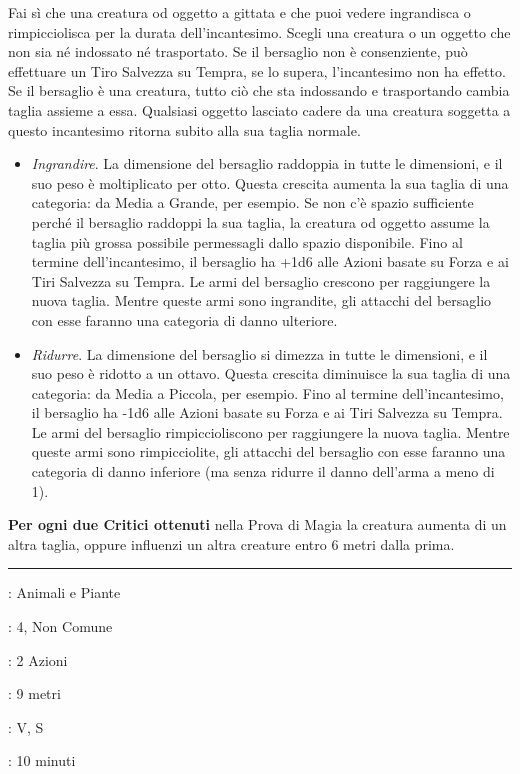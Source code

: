 \begin{multicols}{2}
Fai sì che una creatura od oggetto a gittata e che puoi vedere ingrandisca o rimpicciolisca per la durata dell'incantesimo. Scegli una creatura o un oggetto che non sia né indossato né trasportato. Se il bersaglio non è consenziente, può effettuare un Tiro Salvezza su Tempra, se lo supera, l'incantesimo non ha effetto. Se il bersaglio è una creatura, tutto ciò che sta indossando e trasportando cambia taglia assieme a essa. Qualsiasi oggetto lasciato cadere da una creatura soggetta a questo incantesimo ritorna subito alla sua taglia normale.

\begin{itemize}[leftmargin=*] \setlength{\itemsep}{0pt}
	\item \emph{Ingrandire}. La dimensione del bersaglio raddoppia in tutte le dimensioni, e il suo peso è moltiplicato per otto. Questa crescita aumenta la sua taglia di una categoria: da Media a Grande, per esempio. Se non c'è spazio sufficiente perché il bersaglio raddoppi la sua taglia, la creatura od oggetto assume la taglia più grossa possibile permessagli dallo spazio disponibile. Fino al termine dell'incantesimo, il bersaglio ha +1d6 alle Azioni basate su Forza e ai Tiri Salvezza su Tempra. Le armi del bersaglio crescono per raggiungere la nuova taglia. Mentre queste armi sono ingrandite, gli attacchi del bersaglio con esse faranno una categoria di danno ulteriore.
	\item \emph{Ridurre}. La dimensione del bersaglio si dimezza in tutte le dimensioni, e il suo peso è ridotto a un ottavo. Questa crescita diminuisce la sua taglia di una categoria: da Media a Piccola, per esempio. Fino al termine dell'incantesimo, il bersaglio ha -1d6 alle Azioni basate su Forza e ai Tiri Salvezza su Tempra. Le armi del bersaglio rimpiccioliscono per raggiungere la nuova taglia. Mentre queste armi sono rimpicciolite, gli attacchi del bersaglio con esse faranno una categoria di danno inferiore (ma senza ridurre il danno dell'arma a meno di 1).
\end{itemize}

\textbf{Per ogni due Critici ottenuti} nella Prova di Magia la creatura aumenta di un altra taglia, oppure influenzi un altra creature entro 6 metri dalla prima.

\smallskip\noindent\rule{\linewidth}{2pt} \hypertarget{Insetto Gigante}{}\medskip{}
\noindent
\begin{description}[noitemsep, topsep=0pt, parsep=0pt, partopsep=0pt, leftmargin=0cm, labelwidth=2.8cm]
	\item[\textbf{Lista di Magia}]: Animali e Piante
	\item[\textbf{Livello}]: 4, Non Comune
	\item[\textbf{T. di Lancio}]: 2 Azioni
	\item[\textbf{Gittata}]: 9 metri
	\item[\textbf{Componenti}]: V, S
	\item[\textbf{Durata}]: 10 minuti
\end{description}


\end{multicols}
